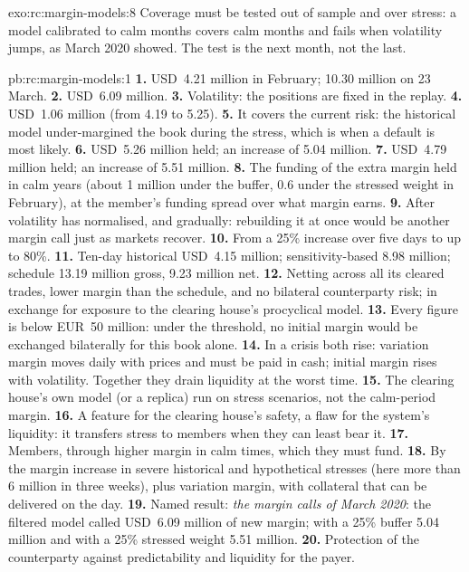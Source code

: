 \begin{solution}{exo:rc:margin-models:8}
Coverage must be tested out of sample and over stress: a model calibrated to calm months covers calm
months and fails when volatility jumps, as March 2020 showed. The test is the next month, not the last.
\end{solution}

\begin{solution}{pb:rc:margin-models:1}
\textbf{1.} USD~4.21 million in February; 10.30 million on 23 March.
\textbf{2.} USD~6.09 million.
\textbf{3.} Volatility: the positions are fixed in the replay.
\textbf{4.} USD~1.06 million (from 4.19 to 5.25).
\textbf{5.} It covers the current risk: the historical model under-margined the book during the stress,
which is when a default is most likely.
\textbf{6.} USD~5.26 million held; an increase of 5.04 million.
\textbf{7.} USD~4.79 million held; an increase of 5.51 million.
\textbf{8.} The funding of the extra margin held in calm years (about 1 million under the buffer, 0.6 under
the stressed weight in February), at the member's funding spread over what margin earns.
\textbf{9.} After volatility has normalised, and gradually: rebuilding it at once would be another margin
call just as markets recover.
\textbf{10.} From a 25\% increase over five days to up to 80\%.
\textbf{11.} Ten-day historical USD~4.15 million; sensitivity-based 8.98 million; schedule 13.19 million
gross, 9.23 million net.
\textbf{12.} Netting across all its cleared trades, lower margin than the schedule, and no bilateral
counterparty risk; in exchange for exposure to the clearing house's procyclical model.
\textbf{13.} Every figure is below EUR~50 million: under the threshold, no initial margin would be
exchanged bilaterally for this book alone.
\textbf{14.} In a crisis both rise: variation margin moves daily with prices and must be paid in cash;
initial margin rises with volatility. Together they drain liquidity at the worst time.
\textbf{15.} The clearing house's own model (or a replica) run on stress scenarios, not the calm-period margin.
\textbf{16.} A feature for the clearing house's safety, a flaw for the system's liquidity: it transfers
stress to members when they can least bear it.
\textbf{17.} Members, through higher margin in calm times, which they must fund.
\textbf{18.} By the margin increase in severe historical and hypothetical stresses (here more than 6 million
in three weeks), plus variation margin, with collateral that can be delivered on the day.
\textbf{19.} Named result: \emph{the margin calls of March 2020}: the filtered model called USD~6.09
million of new margin; with a 25\% buffer 5.04 million and with a 25\% stressed weight 5.51 million.
\textbf{20.} Protection of the counterparty against predictability and liquidity for the payer.
\end{solution}

